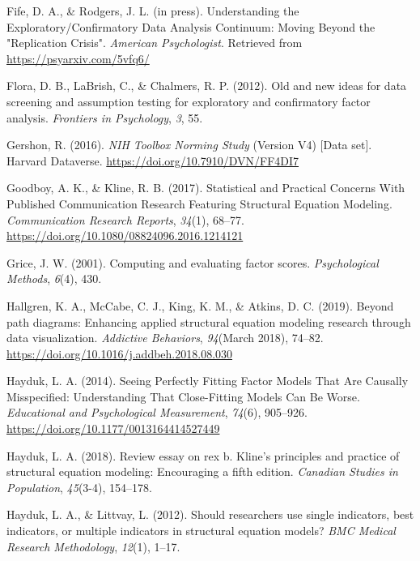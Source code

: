 \documentclass[
  english,
  man]{apa6}
\newlength{\cslhangindent}
\newenvironment{cslreferences}%
  {\setlength{\parindent}{0pt}%
  \everypar{\setlength{\hangindent}{\cslhangindent}}\ignorespaces}%
  {\par}
\begin{document}
\begin{cslreferences}
\leavevmode\hypertarget{ref-Fife2019a}{}%
Fife, D. A., \& Rodgers, J. L. (in press). Understanding the Exploratory/Confirmatory Data Analysis Continuum: Moving Beyond the "Replication Crisis". \emph{American Psychologist}. Retrieved from \url{https://psyarxiv.com/5vfq6/}

\leavevmode\hypertarget{ref-flora2012old}{}%
Flora, D. B., LaBrish, C., \& Chalmers, R. P. (2012). Old and new ideas for data screening and assumption testing for exploratory and confirmatory factor analysis. \emph{Frontiers in Psychology}, \emph{3}, 55.

\leavevmode\hypertarget{ref-toolboxData}{}%
Gershon, R. (2016). \emph{NIH Toolbox Norming Study} (Version V4) {[}Data set{]}. Harvard Dataverse. \url{https://doi.org/10.7910/DVN/FF4DI7}

\leavevmode\hypertarget{ref-Goodboy2017}{}%
Goodboy, A. K., \& Kline, R. B. (2017). Statistical and Practical Concerns With Published Communication Research Featuring Structural Equation Modeling. \emph{Communication Research Reports}, \emph{34}(1), 68--77. \url{https://doi.org/10.1080/08824096.2016.1214121}

\leavevmode\hypertarget{ref-grice2001computing}{}%
Grice, J. W. (2001). Computing and evaluating factor scores. \emph{Psychological Methods}, \emph{6}(4), 430.

\leavevmode\hypertarget{ref-Hallgren2019a}{}%
Hallgren, K. A., McCabe, C. J., King, K. M., \& Atkins, D. C. (2019). Beyond path diagrams: Enhancing applied structural equation modeling research through data visualization. \emph{Addictive Behaviors}, \emph{94}(March 2018), 74--82. \url{https://doi.org/10.1016/j.addbeh.2018.08.030}

\leavevmode\hypertarget{ref-Hayduk2014}{}%
Hayduk, L. A. (2014). Seeing Perfectly Fitting Factor Models That Are Causally Misspecified: Understanding That Close-Fitting Models Can Be Worse. \emph{Educational and Psychological Measurement}, \emph{74}(6), 905--926. \url{https://doi.org/10.1177/0013164414527449}

\leavevmode\hypertarget{ref-hayduk2018review}{}%
Hayduk, L. A. (2018). Review essay on rex b. Kline's principles and practice of structural equation modeling: Encouraging a fifth edition. \emph{Canadian Studies in Population}, \emph{45}(3-4), 154--178.

\leavevmode\hypertarget{ref-hayduk2012should}{}%
Hayduk, L. A., \& Littvay, L. (2012). Should researchers use single indicators, best indicators, or multiple indicators in structural equation models? \emph{BMC Medical Research Methodology}, \emph{12}(1), 1--17.


\end{cslreferences}
\end{document}

